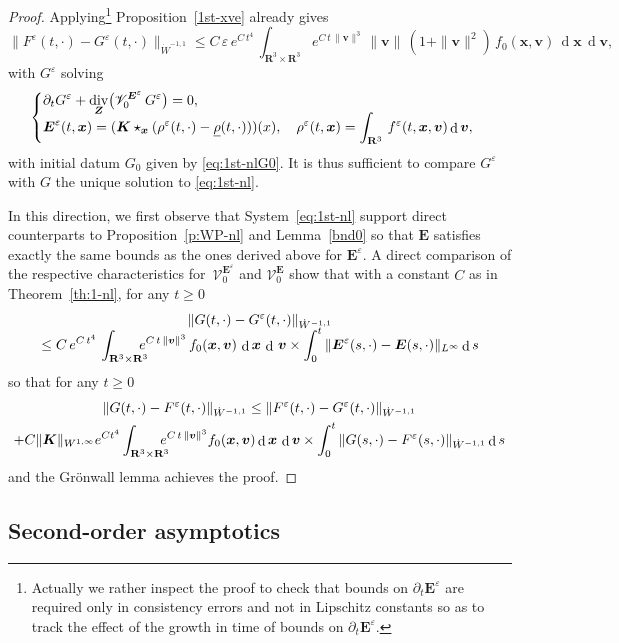 \documentclass[10pt]{amsart}
\let\mathcal\mathscr
\newenvironment{splitcases}
{\begin{cases}\begin{aligned}}
{\end{aligned}\end{cases}}
\let\eps\varepsilon
\let\d\partial
\DeclareMathOperator\dD{d}\let\dd\dD
\DeclareMathOperator{\Div}{div}
\theoremstyle{plain}
\theoremstyle{definition}
\newcommand\R{\mathbf R}
\newcommand\bE{{\boldsymbol E}}
\newcommand\bK{{\boldsymbol K}}
\newcommand\bfv{{\boldsymbol v}}
\newcommand\bfx{{\boldsymbol x}}
\newcommand\bfZ{{\boldsymbol Z}}
\newcommand\urho{{\underline \rho}}
\newcommand\cV{{\mathcal V}}
\begin{document}
\begin{proof}
Applying\footnote{Actually we rather inspect the proof to check that bounds on $\d_t\bE^\eps$ are required only in consistency errors and not in Lipschitz constants so as to track the effect of the growth in time of bounds on $\d_t\bE^\eps$.} Proposition~\ref{1st-xve} already gives
\[
\|F^\eps(t,\cdot)-G^\eps(t,\cdot)\|_{\dot{W}^{-1,1}}\leq C\,\eps\,e^{C\,t^4}\,\int_{\R^3\times\R^3} e^{C\,t\,\|\bfv\|^3}\,\|\bfv\|\,(1+\|\bfv\|^2)\,f_0(\bfx,\bfv)\,\dD\bfx\,\dD\bfv,
\]
with $G^\eps$ solving
\[
\begin{splitcases}
&\d_t G^\eps+\Div_\bfZ \bigl(\cV_0^{\bE^\eps}\,G^\eps \bigr) =0,\\[-5pt]
&\bE^\eps(t,\bfx)=(\bK\star_{\bfx}(\rho^\eps(t,\cdot)-\urho(t,\cdot)))(x),\quad
\rho^\eps(t,\bfx)=\int_{\R^3}\,f^\eps(t,\bfx,\bfv)\dD \bfv,
\end{splitcases}
\]
with initial datum $G_0$ given by \eqref{eq:1st-nlG0}. It is thus sufficient to compare $G^\eps$
with $G$ the unique solution to \eqref{eq:1st-nl}.

In this direction, we first observe that System~\eqref{eq:1st-nl} support direct counterparts to Proposition~\ref{p:WP-nl} and Lemma~\ref{bnd0} so that $\bE$ satisfies exactly the same bounds as the ones derived above for $\bE^\eps$. A direct comparison of the respective characteristics for~$\cV_0^{\bE^\eps}$ and $\cV_0^{\bE}$ show that with a constant $C$ as in Theorem~\ref{th:1-nl}, for any $t\geq0$
\begin{multline*}
\|G(t,\cdot)-G^\eps(t,\cdot)\|_{\dot{W}^{-1,1}}\\[-5pt]
\leq
C\,e^{C\,t^4}\,\int_{\R^3\times\R^3}\hspace*{-3mm} e^{C\,t\,\|\bfv\|^3}\,f_0(\bfx,\bfv)\,\dD\bfx\,\dD\,\bfv
\times \int_0^t\|\bE^\eps(s,\cdot)-\bE(s,\cdot)\|_{L^\infty}\dD s
\end{multline*}
so that for any $t\geq0$
\begin{multline*}
\|G(t,\cdot)-F^\eps(t,\cdot)\|_{\dot{W}^{-1,1}}\leq \|F^\eps(t,\cdot)-G^\eps(t,\cdot)\|_{\dot{W}^{-1,1}}\\
+C\|\bK\|_{W^{1,\infty}}e^{C t^4}\int_{\R^3\times\R^3}\hspace*{-3mm} e^{C\,t\,\|\bfv\|^3}f_0(\bfx,\bfv)\dD\bfx\,\dD\bfv
\times \int_0^t\|G(s,\cdot)-F^\eps(s,\cdot)\|_{\dot{W}^{-1,1}}\dD s
\end{multline*}
and the Grönwall lemma achieves the proof.
\end{proof}

\subsection{Second-order asymptotics}\label{s:2nd-nl}
\end{document}
